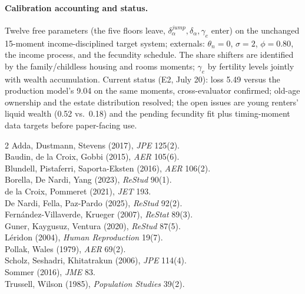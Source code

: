 \documentclass[10pt]{article}
\begin{document}
\paragraph{Calibration accounting and status.}
Twelve free parameters (the five floors leave, $\delta^{jump}_\alpha,
\delta_\alpha, \gamma_e$ enter) on the unchanged 15-moment
income-disciplined target system; externals: $\theta_n=0$, $\sigma=2$,
$\phi=0.80$, the income process, and the fecundity schedule. The share
shifters are identified by the family/childless housing and rooms
moments; $\gamma_e$ by fertility levels jointly with wealth accumulation.
Current status (E2, July 20): loss 5.49 versus the production model's
9.04 on the same moments, cross-evaluator confirmed; old-age ownership
and the estate distribution resolved; the open issues are young renters'
liquid wealth (0.52 vs.\ 0.18) and the pending fecundity fit plus
timing-moment data targets before paper-facing use.

\begin{footnotesize}
\begin{multicols}{2}
\noindent Adda, Dustmann, Stevens (2017), \emph{JPE} 125(2).\\
Baudin, de la Croix, Gobbi (2015), \emph{AER} 105(6).\\
Blundell, Pistaferri, Saporta-Eksten (2016), \emph{AER} 106(2).\\
Borella, De Nardi, Yang (2023), \emph{ReStud} 90(1).\\
de la Croix, Pommeret (2021), \emph{JET} 193.\\
De Nardi, Fella, Paz-Pardo (2025), \emph{ReStud} 92(2).\\
Fern\'andez-Villaverde, Krueger (2007), \emph{ReStat} 89(3).\\
Guner, Kaygusuz, Ventura (2020), \emph{ReStud} 87(5).\\
L\'eridon (2004), \emph{Human Reproduction} 19(7).\\
Pollak, Wales (1979), \emph{AER} 69(2).\\
Scholz, Seshadri, Khitatrakun (2006), \emph{JPE} 114(4).\\
Sommer (2016), \emph{JME} 83.\\
Trussell, Wilson (1985), \emph{Population Studies} 39(2).
\end{multicols}
\end{footnotesize}
\end{document}
